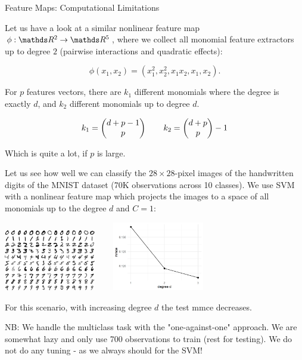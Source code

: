 \documentclass[11pt,compress,t,notes=noshow, xcolor=table]{beamer}
\begin{document}
\begin{vbframe}{Feature Maps: Computational Limitations}

Let us have a look at a similar nonlinear feature map $\phi: \R^2 \to \R^5$, where we collect all monomial feature extractors up to degree $2$ (pairwise interactions and quadratic effects):

$$
\phi(x_1, x_2) = (x_1^2, x_2^2, x_1  x_2, x_1, x_2).
$$

For $p$ features vectors, there are $k_1$ different monomials where the degree is exactly $d$, and $k_2$ different monomials up to degree $d$.


$$
k_1 = \begin{pmatrix} d + p - 1 \\ p \end{pmatrix} \qquad k_2 = \begin{pmatrix} d + p \\ p \end{pmatrix}-1
$$

Which is quite a lot, if $p$ is large.

\framebreak 
\begin{footnotesize}
Let us see how well we can classify the $28 \times 28$-pixel images of the handwritten digits of the MNIST dataset (70K observations across 10 classes). 
We use SVM with a nonlinear feature map which projects the images to a space of all monomials up to the degree $d$ and $C=1$:


\begin{center}
\includegraphics[width = 4cm ]{figure_man/introduction/mnist-eps-converted-to.pdf} ~~~ \includegraphics[width=4cm]{figure/mnist_svm_mmce.png}
\end{center}




\vspace{.3cm}
For this scenario, with increasing degree $d$ the test mmce decreases.

\vfill

NB: We handle the multiclass task with the "one-against-one" approach. 
We are somewhat lazy and only use 700 observations to train (rest for testing).
We do not do any tuning - as we always should for the SVM!


\end{footnotesize}
\end{vbframe}
\end{document}
